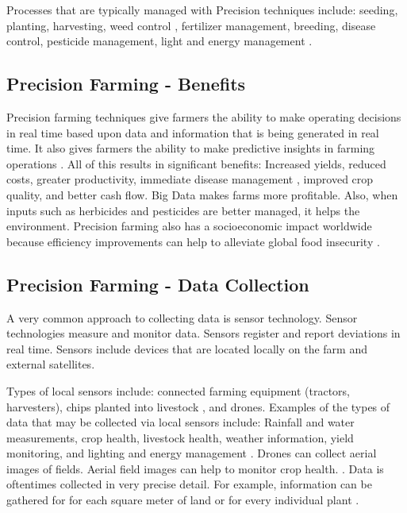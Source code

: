 \documentclass[sigconf]{acmart}
\begin{document}
Processes that are typically managed with Precision techniques include: seeding, planting, harvesting, weed control \cite{www-google-Digital}, fertilizer management, breeding, disease control, pesticide management, light and energy management \cite{Wolfert}. 

\subsection {Precision Farming - Benefits}

Precision farming techniques give farmers the ability to make operating decisions in real time based upon data and information that is being generated in real time.  It also gives farmers the ability to make predictive insights in farming operations \cite{Wolfert}.  All of this results in significant benefits: Increased yields, reduced costs, greater productivity, immediate disease management \cite{www-google-Crop}, improved crop quality, and better cash flow.  Big Data makes farms more profitable. Also, when inputs such as herbicides and pesticides are better managed, it helps the environment. Precision farming also has a socioeconomic impact worldwide because efficiency improvements can help to alleviate global food insecurity \cite{Wolfert}.

\subsection{Precision Farming - Data Collection}

A very common approach to collecting data is sensor technology.  Sensor technologies measure and monitor data. Sensors register and report deviations in real time.  Sensors include devices that are located locally on the farm and external satellites. 

Types of local sensors include: connected farming equipment (tractors, harvesters), chips planted into livestock \cite{DevEcon}, and drones.  Examples of the types of data that may be collected via local sensors include: Rainfall and water measurements, crop health, livestock health, weather information, yield monitoring, and lighting and energy management \cite{Wolfert}.  Drones can collect aerial images of fields.  Aerial field images can help to monitor crop health. \cite{www-google-Wikipedia}. Data is oftentimes collected in very precise detail.  For example, information can be gathered for for each square meter of land or for every individual plant \cite{www-google-Digital}. 
\end{document}
